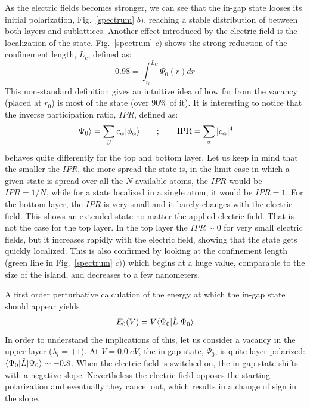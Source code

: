 As the electric fields becomes stronger, we can see that the in-gap state looses its initial polarization, Fig.~\ref{spectrum} $b)$, reaching a stable distribution of between both layers and sublattices. Another effect introduced by the electric field is the localization of the state. Fig.~\ref{spectrum} $c)$ shows the strong reduction of the confinement length, $L_c$, defined as:
\begin{equation}
  0.98 = \int_{r_0}^{L_C} \Psi_0(r) dr   %
\end{equation}
This non-standard definition gives an intuitive idea of how far from the vacancy (placed at $r_0$) is most of the state (over $90\%$ of it).
It is interesting to notice that the inverse participation ratio, $IPR$, defined as:
\begin{equation}
  |\Psi_0\rangle = \sum_\beta c_\alpha|\phi_\alpha\rangle\quad\quad;\quad\quad
  \text{IPR} = \sum_\alpha |c_\alpha|^4
\end{equation}
behaves quite differently for the top and bottom layer. Let us keep in mind that the smaller the $IPR$, the more spread the state is, in the limit case in which a given state is spread over all the $N$ available atoms, the $IPR$ would be $IPR=1/N$, while for a state localized in a single atom, it would be $IPR=1$.
For the bottom layer, the $IPR$ is very small and it barely changes with the electric field. This shows an extended state no matter the applied electric field. That is not the case for the top layer. In the top layer the $IPR\sim0$ for very small electric fields, but it increases rapidly with the electric field, showing that the state gets quickly localized. This is also confirmed by looking at the confinement length (green line in Fig.~\ref{spectrum} $c)$) which begins at a huge value, comparable to the size of the island, and decreases to a few nanometers.


A first order perturbative calculation of the energy at which the in-gap state should appear yields
\begin{equation}
  E_0 (V) = V \langle\Psi_0|\hat{L}|\Psi_0\rangle
\end{equation}
In order to understand the implications of this, let us consider a vacancy in the upper layer ($\lambda_l=+1$). At $V=\SI{0.0}{eV}$, the in-gap state, $\Psi_0$, is quite layer-polarized: $\langle\Psi_0|\hat{L}|\Psi_0\rangle\sim-0.8$. When the electric field is switched on, the in-gap state shifts with a negative slope. Nevertheless the electric field opposes the starting polarization and eventually they cancel out, which results in a change of sign in the slope. %

